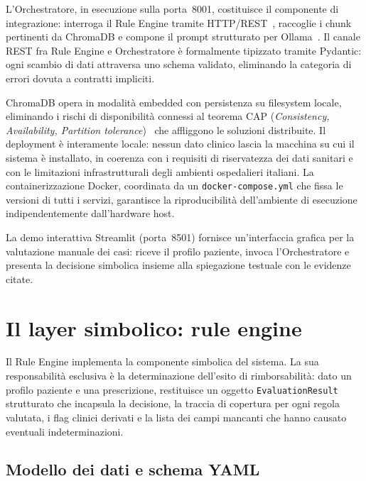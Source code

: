 L'Orchestratore, in esecuzione sulla porta~8001, costituisce il componente
di integrazione: interroga il Rule Engine tramite HTTP/REST~\cite{fielding2000rest},
raccoglie i chunk pertinenti da ChromaDB e compone il prompt strutturato per
Ollama~\cite{ollama2024}.
Il canale REST fra Rule Engine e Orchestratore è formalmente tipizzato tramite
Pydantic: ogni scambio di dati attraversa uno schema validato, eliminando
la categoria di errori dovuta a contratti impliciti.

ChromaDB opera in modalità embedded con persistenza su filesystem locale,
eliminando i rischi di disponibilità connessi al teorema CAP (\emph{Consistency, Availability, Partition tolerance})~\cite{brewer2000cap}
che affliggono le soluzioni distribuite.
Il deployment è interamente locale: nessun dato clinico lascia la macchina
su cui il sistema è installato, in coerenza con i requisiti di riservatezza
dei dati sanitari e con le limitazioni infrastrutturali degli ambienti
ospedalieri italiani.
La containerizzazione Docker, coordinata da un \texttt{docker-compose.yml}
che fissa le versioni di tutti i servizi, garantisce la riproducibilità
dell'ambiente di esecuzione indipendentemente dall'hardware host.

La demo interattiva Streamlit (porta~8501) fornisce un'interfaccia grafica
per la valutazione manuale dei casi: riceve il profilo paziente, invoca
l'Orchestratore e presenta la decisione simbolica insieme alla spiegazione
testuale con le evidenze citate.

\section{Il layer simbolico: rule engine}
\label{sec:layer-simbolico}

Il Rule Engine implementa la componente simbolica del sistema.
La sua responsabilità esclusiva è la determinazione dell'esito di
rimborsabilità: dato un profilo paziente e una prescrizione, restituisce
un oggetto \texttt{EvaluationResult} strutturato che incapsula la decisione,
la traccia di copertura per ogni regola valutata, i flag clinici derivati
e la lista dei campi mancanti che hanno causato eventuali indeterminazioni.

\subsection{Modello dei dati e schema YAML}
\label{subsec:modello-dati}

